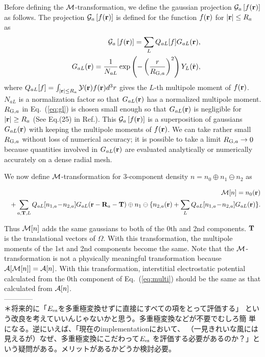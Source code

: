 \documentclass[a4paper,10pt,aip,onecolumn,amsmath,amssymb,floatfix,rmp]{revtex4-1}
\newcommand{\bfr}{{\bf r}}
\newcommand{\bfT}{{\bf T}}
\newcommand{\bfR}{{\bf R}}
\newcommand{\YY}{{\cal Y}}
\newcommand{\GG}{{\cal G}}
\newcommand{\ooplus}{\oplus}
\newcommand{\oominus}{\ominus}
\def\calR{{\cal A}}
\newcommand{\req}[1]{\mbox{Eq.~\!(\ref{#1})}}
\def\RGSa{R_{{\rm G},a}}
\def\MM{{\cal M}}
\def\intaa{\int_{|\bfr|\leq R_a}}
\begin{document}
Before defining the $\MM$-transformation, we define the gaussian
projection $\GG_a \left[f(\bfr)\right]$ as follows.  The projection
$\GG_a \left[f(\bfr)\right]$ is defined for the function $f(\bfr)$ for
$|\bfr|\leq R_a$ as
\begin{eqnarray}
&&\GG_a \left[f(\bfr)\right]
=\sum_L Q_{aL}[f] G_{aL}(\bfr), \label{eq:gdef} \\
&&G_{aL}(\bfr)= \frac{1}{N_{aL}} \exp\left(-\left(\frac{r}{\RGSa}\right)^2\right)
Y_L(\hat{\bfr}),\label{eq:gl}
\end{eqnarray}
where $Q_{aL}[f]=\intaa \YY(\bfr) f(\bfr) d^3r$
gives the $L$-th multipole moment of $f(\bfr)$.
$N_{aL}$ is a normalization factor
so that $G_{aL}(\bfr)$ has a normalized multipole moment.
$\RGSa$ in \req{eq:gl} is chosen small enough so that $G_{aL}(\bfr)$ is
negligible for $|\bfr|\geq R_a$ (See Eq.(25) in
Ref.). This $\GG_a \left[f(\bfr)\right]$ is a
superposition of gaussians $G_{aL}(\bfr)$ with keeping the multipole
moments of $f(\bfr)$.  We can take rather small $\RGSa$ without loss of
numerical accuracy; it is possible to take a limit $\RGSa \to 0$ because
quantities involved in $G_{aL}(\bfr)$ are evaluated analytically or
numerically accurately on a dense radial mesh.

We now define $\MM$-transformation for
3-component density $n= n_0 \ooplus n_1 \oominus n_2$ as
\begin{widetext}
\begin{eqnarray}
&&\MM[n]=  n_0(\bfr) \nonumber \\
&&+ \sum_{a,\bfT,L} Q_{aL}[n_{1,a}\!-\!n_{2,a}]G_{aL}(\bfr-\bfR_a-\bfT) 
\ooplus n_{1} \oominus 
\{n_{2,a}(\bfr) + \sum_L Q_{aL}[n_{1,a}\!-\!n_{2,a}]G_{aL}(\bfr) \}. \label{eq:multi}
\end{eqnarray}
\end{widetext}
Thus $\MM[n]$ adds the same gaussians to both of the 0th and 2nd
components.  $\bfT$ is the translational vectors of $\Omega$.  With this
transformation, the multipole moments of the 1st and 2nd components become
the same.  Note that the $\MM$-transformation is not a physically
meaningful transformation because $\calR[\MM[n]]=\calR[n]$.  With this
transformation, interstitial electrostatic potential calculated from the
0th component of \req{eq:multi} should be the same as that calculated
from $\calR[n]$.\\

------------\\
＊将来的に「$E_{\rm es}$を多重極変換せずに直接にすべての項をとって評価する」
という改良を考えていいんじゃないかと思う。多重極変換などが不要でむしろ簡
単になる。逆にいえば、「現在のimplementationにおいて、
（一見きれいな風には見えるが）なぜ、多重極変換にこだわって$E_{\rm es}$
を評価する必要があるのか？」という疑問がある。メリットがあるかどうか検討必要。
\end{document}
